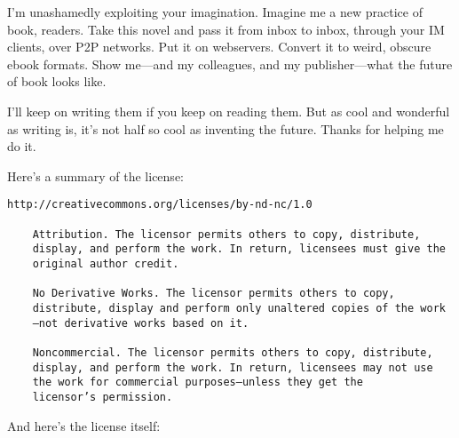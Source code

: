 I’m unashamedly exploiting your imagination. Imagine me a new
practice of book, readers. Take this novel and pass it from inbox
to inbox, through your IM clients, over P2P networks. Put it on
webservers. Convert it to weird, obscure ebook formats. Show me—and
my colleagues, and my publisher—what the future of book looks
like.

I’ll keep on writing them if you keep on reading them. But as cool
and wonderful as writing is, it’s not half so cool as inventing the
future. Thanks for helping me do it.

Here’s a summary of the license:

\begin{Verbatim}[fontsize=\small]
    http://creativecommons.org/licenses/by-nd-nc/1.0
    
    Attribution. The licensor permits others to copy, distribute,
    display, and perform the work. In return, licensees must give the
    original author credit.
    
    No Derivative Works. The licensor permits others to copy,
    distribute, display and perform only unaltered copies of the work
    —not derivative works based on it.
    
    Noncommercial. The licensor permits others to copy, distribute,
    display, and perform the work. In return, licensees may not use
    the work for commercial purposes—unless they get the
    licensor’s permission.
\end{Verbatim}
And here’s the license itself:

